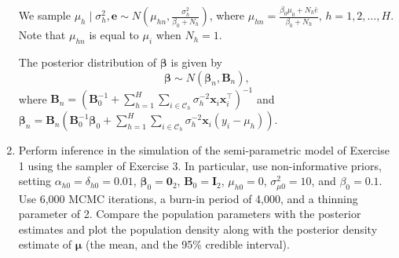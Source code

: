 \begin{enumerate}[leftmargin=*]
We sample $\mu_h\mid \sigma^2_h,\bm{e}\sim N \left(\mu_{hn}, \frac{\sigma_{h}^2}{\beta_0+N_h}\right)$, where $\mu_{hn}=\frac{\beta_0\mu_0+N_h\bar{e}}{\beta_0+N_h}$,
$h=1,2,\dots,H$. Note that $\mu_{hn}$ is equal to $\mu_i$ when $N_h=1$.  

The posterior distribution of $\boldsymbol{\beta}$ is given by 
$$\boldsymbol{\beta}\sim N(\boldsymbol{\beta}_{n},\boldsymbol{B}_{n}),$$ where $\boldsymbol{B}_{n}=(\boldsymbol{B}_{0}^{-1}+\sum_{h=1}^H\sum_{i\in \mathcal{C}_h}\sigma_h^{-2}\boldsymbol{x}_i\boldsymbol{x}_i^{\top})^{-1}$ and $\boldsymbol{\beta}_{n}=\boldsymbol{B}_{n}(\boldsymbol{B}_{0}^{-1}\boldsymbol{\beta}_{0}+\sum_{h=1}^H\sum_{i\in \mathcal{C}_h}\sigma_h^{-2}\boldsymbol{x}_i(y_i-\mu_h))$.


\item  Perform inference in the simulation of the semi-parametric model of Exercise 1 using the sampler of Exercise 3. In particular, use non-informative priors, setting $\alpha_{h0}=\delta_{h0}=0.01$, $\bm{\beta}_0=\bm{0}_2$, $\bm{B}_0=\bm{I}_2$, $\mu_{h0}=0$, $\sigma^2_{\mu 0}=10$, and $\beta_0 = 0.1$. Use 6,000 MCMC iterations, a burn-in period of 4,000, and a thinning parameter of 2. Compare the population parameters with the posterior estimates and plot the population density along with the posterior density estimate of $\bm{\mu}$ (the mean, and the 95\% credible interval).\\ 

 
\end{enumerate}